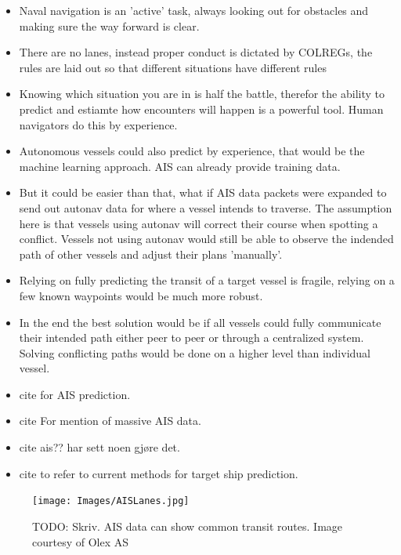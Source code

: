 \begin{itemize}
    \item Naval navigation is an 'active' task, always looking out for obstacles and making sure the way forward is clear.
    \item There are no lanes, instead proper conduct is dictated by \gls{COLREGs}, the rules are laid out so that different situations
    have different rules
    \item Knowing which situation you are in is half the battle, therefor the ability to predict and estiamte how encounters will happen
    is a powerful tool. Human navigators do this by experience.
    \item Autonomous vessels could also predict by experience, that would be the machine learning approach. \gls{AIS} can already provide training data.
    \item But it could be easier than that, what if \gls{AIS} data packets were expanded to send out autonav data for where a vessel intends to traverse.
    The assumption here is that vessels using autonav will correct their course when spotting a conflict. Vessels not using autonav would still be able to observe
    the indended path of other vessels and adjust their plans 'manually'.
    \item Relying on fully predicting the transit of a target vessel is fragile, relying on a few known waypoints would be much more robust.
    \item In the end the best solution would be if all vessels could fully communicate their intended path either peer to peer or through
    a centralized system. Solving conflicting paths would be done on a higher level than individual vessel.
    \item cite \cite{scholler2021trajectory} for AIS prediction.
    \item cite \cite{zhang2021collision} For mention of massive AIS data.
    \item cite ais?? har sett noen gjøre det.
    \item cite \cite{huang2020ship} to refer to current methods for target ship prediction.
\end{itemize}

\begin{figure}
    \centering
    \label{FIG: AIS lanes}
    \texttt{[image: Images/AISLanes.jpg]}
    \caption{TODO: Skriv. AIS data can show common transit routes. Image courtesy of Olex AS}
\end{figure}



\newpage